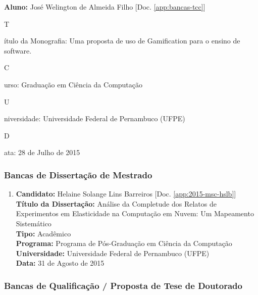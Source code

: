 \documentclass[a4paper,oneside,12pt]{article}
\newcommand{\SubItem}[1]{
    {\setlength\itemindent{15pt} \item[-] #1}}
\begin{document}
\begin{enumerate}
\renewcommand{\labelenumi}{{\large\bfseries\arabic{enumi}.}}
\vspace{0.3cm}

\item       \textbf{Aluno:} José Welington de Almeida Filho [Doc. \ref{app:bancas-tcc}]
    \SubItem  Título da Monografia: Uma proposta de uso de Gamification para o ensino de software.
    \SubItem  Curso: Graduação em Ciência da Computação\\
           \SubItem Universidade: Universidade Federal de Pernambuco (UFPE)
           \SubItem  Data: 28 de Julho de 2015\\

\end{enumerate}


\subsubsection{Bancas de Dissertação de Mestrado}
\vspace{0.3cm}

\begin{enumerate}
\renewcommand{\labelenumi}{{\large\bfseries\arabic{enumi}.}}
\vspace{0.3cm}

\item       \textbf{Candidato:} Helaine Solange Lins Barreiros [Doc. \ref{app:2015-msc-hslb}] \\
            \textbf{Título da Dissertação:} Análise da Completude dos Relatos de Experimentos em Elasticidade na Computação em Nuvem: Um Mapeamento Sistemático\\
            \textbf{Tipo:} Acadêmico\\
            \textbf{Programa:} Programa de Pós-Graduação em Ciência da Computação\\
            \textbf{Universidade:} Universidade Federal de Pernambuco (UFPE)\\
            \textbf{Data:} 31 de Agosto de 2015

\end{enumerate}


\subsubsection{Bancas de Qualificaç\~ao / Proposta de Tese de Doutorado}
\vspace{0.3cm}
\end{document}

